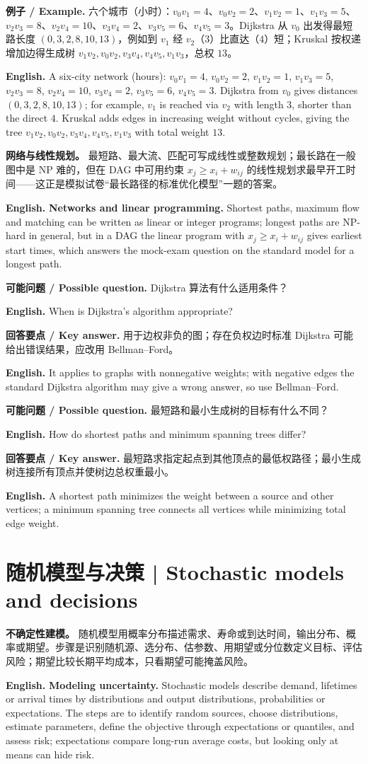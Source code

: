 \documentclass[UTF8,11pt,a4paper]{ctexart}
\newcommand{\EN}[1]{\par\noindent\textbf{English.} #1\par}
\newcommand{\EX}[2]{\par\noindent\textbf{例子 / Example.} #1\par\EN{#2}}
\newcommand{\ASK}[4]{\par\noindent\textbf{可能问题 / Possible question.} #1\par\EN{#2}\noindent\textbf{回答要点 / Key answer.} #3\par\EN{#4}\smallskip}
\begin{document}
\EX{六个城市（小时）：$v_0v_1=4$、$v_0v_2=2$、$v_1v_2=1$、$v_1v_3=5$、$v_2v_3=8$、$v_2v_4=10$、$v_3v_4=2$、$v_3v_5=6$、$v_4v_5=3$。Dijkstra 从 $v_0$ 出发得最短路长度 $(0,3,2,8,10,13)$，例如到 $v_1$ 经 $v_2$（$3$）比直达（$4$）短；Kruskal 按权递增加边得生成树 $v_1v_2,v_0v_2,v_3v_4,v_4v_5,v_1v_3$，总权 $13$。}{A six-city network (hours): $v_0v_1=4$, $v_0v_2=2$, $v_1v_2=1$, $v_1v_3=5$, $v_2v_3=8$, $v_2v_4=10$, $v_3v_4=2$, $v_3v_5=6$, $v_4v_5=3$. Dijkstra from $v_0$ gives distances $(0,3,2,8,10,13)$; for example, $v_1$ is reached via $v_2$ with length $3$, shorter than the direct $4$. Kruskal adds edges in increasing weight without cycles, giving the tree $v_1v_2,v_0v_2,v_3v_4,v_4v_5,v_1v_3$ with total weight $13$.}
\noindent\textbf{网络与线性规划。} 最短路、最大流、匹配可写成线性或整数规划；最长路在一般图中是 NP 难的，但在 DAG 中可用约束 $x_j\ge x_i+w_{ij}$ 的线性规划求最早开工时间——这正是模拟试卷“最长路径的标准优化模型”一题的答案。
\EN{\textbf{Networks and linear programming.} Shortest paths, maximum flow and matching can be written as linear or integer programs; longest paths are NP-hard in general, but in a DAG the linear program with $x_j\ge x_i+w_{ij}$ gives earliest start times, which answers the mock-exam question on the standard model for a longest path.}
\ASK{Dijkstra 算法有什么适用条件？}{When is Dijkstra's algorithm appropriate?}{用于边权非负的图；存在负权边时标准 Dijkstra 可能给出错误结果，应改用 Bellman--Ford。}{It applies to graphs with nonnegative weights; with negative edges the standard Dijkstra algorithm may give a wrong answer, so use Bellman--Ford.}
\ASK{最短路和最小生成树的目标有什么不同？}{How do shortest paths and minimum spanning trees differ?}{最短路求指定起点到其他顶点的最低权路径；最小生成树连接所有顶点并使树边总权重最小。}{A shortest path minimizes the weight between a source and other vertices; a minimum spanning tree connects all vertices while minimizing total edge weight.}

\section{随机模型与决策 | Stochastic models and decisions}
\noindent\textbf{不确定性建模。} 随机模型用概率分布描述需求、寿命或到达时间，输出分布、概率或期望。步骤是识别随机源、选分布、估参数、用期望或分位数定义目标、评估风险；期望比较长期平均成本，只看期望可能掩盖风险。
\EN{\textbf{Modeling uncertainty.} Stochastic models describe demand, lifetimes or arrival times by distributions and output distributions, probabilities or expectations. The steps are to identify random sources, choose distributions, estimate parameters, define the objective through expectations or quantiles, and assess risk; expectations compare long-run average costs, but looking only at means can hide risk.}
\end{document}

